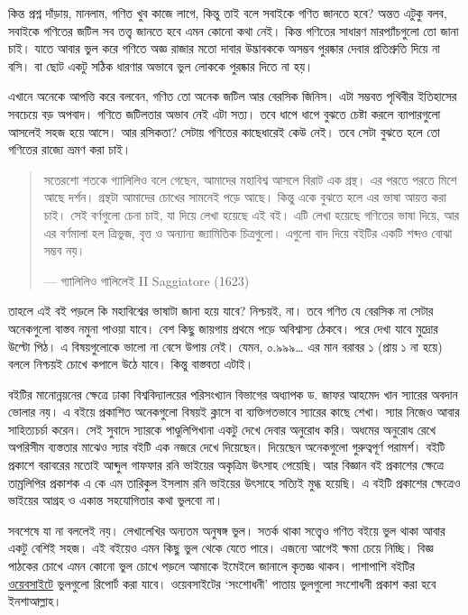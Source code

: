 \documentclass[
]{book}
\begin{document}
কিন্ত প্রশ্ন দাঁড়ায়, মানলাম, গণিত খুব কাজে লাগে, কিন্তু তাই বলে সবাইকে গণিত জানতে হবে? অন্তত এটুকু বলব, সবাইকে গণিতের জটিল সব তত্ত্ব জানতে হবে এমন কোনো কথা নেই। কিন্ত গণিতের সাধারণ মারপ্যাঁচগুলো তো জানা চাই। যাতে আবার ভুল করে গণিতে অজ্ঞ রাজার মতো দাবার উদ্ভাবককে অসম্ভব পুরষ্কার দেবার প্রতিশ্রুতি দিয়ে না বসি। বা ছোট একটু সঠিক ধারণার অভাবে ভুল লোককে পুরষ্কার দিতে না হয়।

এখানে অনেকে আপত্তি করে বলবেন, গণিত তো অনেক জটিল আর বেরসিক জিনিস। এটা সম্ভবত পৃথিবীর ইতিহাসের সবচেয়ে বড় অপবাদ। গণিতে জটিলতার অভাব নেই এটা সত্য। তবে ধাপে ধাপে বুঝতে চেষ্টা করলে ব্যাপারগুলো আসলেই সহজ হয়ে আসে। আর রসিকতা? সেটায় গণিতের কাছেধারেই কেউ নেই। তবে সেটা বুঝতে হলে তো গণিতের রাজ্যে ভ্রমণ করা চাই।

\begin{quote}
সতেরশো শতকে গ্যালিলিও বলে গেছেন, আমাদের মহাবিশ্ব আসলে বিরাট এক গ্রন্থ। এর পরতে পরতে মিশে আছে দর্শন। গ্রন্থটা আমাদের চোখের সামনেই পড়ে আছে। কিন্তু একে বুঝতে হলে এর ভাষা আয়ত্ত করা চাই। সেই বর্ণগুলো চেনা চাই, যা দিয়ে লেখা হয়েছে এই বই। এটি লেখা হয়েছে গণিতের ভাষা দিয়ে, আর এর বর্ণমালা হল ত্রিভুজ, বৃত্ত ও অন্যান্য জ্যামিতিক চিত্রগুলো। এগুলো বাদ দিয়ে বইটির একটি শব্দও বোঝা সম্ভব নয়।

--- গ্যালিলিও গালিলেই II Saggiatore (1623)
\end{quote}

তাহলে এই বই পড়লে কি মহাবিশ্বের ভাষাটা জানা হয়ে যাবে? নিশ্চয়ই, না। তবে গণিত যে বেরসিক না সেটার অনেকগুলো বাস্তব নমুনা পাওয়া যাবে। বেশ কিছু জায়গায় প্রথমে পড়ে অবিশ্বাস্য ঠেকবে। পরে দেখা যাবে মুদ্রোর উল্টো পিঠ। এ বিষয়গুলোকে ভালো না বেসে উপায় নেই। যেমন, ০.৯৯৯\ldots{} এর মান বরাবর ১ (প্রায় ১ না হয়ে) বললে নিশ্চয়ই চোখে কপালে উঠে যাবে। কিন্তু বাস্তবতা এটাই।

বইটির মানোন্নয়নের ক্ষেত্রে ঢাকা বিশ্ববিদ্যালয়ের পরিসংখ্যান বিভাগের অধ্যাপক ড. জাফর আহমেদ খান স্যারের অবদান ভোলার নয়। এ বইয়ে প্রকাশিত অনেকগুলো বিষয়ই ক্লাসে বা ব্যক্তিগতভাবে স্যারের কাছে শেখা। স্যার নিজেও আবার সাহিত্যচর্চা করেন। সেই সুবাদে স্যারকে পাণ্ডুলিপিখানা একটু দেখে দেবার অনুরোধ করি। অধমের অনুরোধ রেখে অপরিসীম ব্যস্ততার মাঝেও স্যার বইটি এক নজরে দেখে দিয়েছেন। দিয়েছেন অনেকগুলো গুরুত্বপূর্ণ পরামর্শ। বইটি প্রকাশে বরাবরের মতোই আব্দুল গাফফার রনি ভাইয়ের অকৃত্রিম উৎসাহ পেয়েছি। আর বিজ্ঞান বই প্রকাশের ক্ষেত্রে তাম্রলিপির প্রকাশক এ কে এম তারিকুল ইসলাম রনি ভাইয়ের উৎসাহে সত্যিই মুগ্ধ হয়েছি। এ বইটি প্রকাশের ক্ষেত্রেও ভাইয়ের আগ্রহ ও একান্ত সহযোগিতার কথা ভুলবো না।

সবশেষে যা না বললেই নয়। লেখালেখির অন্যতম অনুষঙ্গ ভুল। সতর্ক থাকা সত্ত্বেও গণিত বইয়ে ভুল থাকা আবার একটু বেশিই সহজ। এই বইয়েও এমন কিছু ভুল থেকে যেতে পারে। এজন্যে আগেই ক্ষমা চেয়ে নিচ্ছি। বিজ্ঞ পাঠকের চোখে এমন কোনো ভুল চোখে পড়লে আমাকে ইমেইলে জানালে কৃতজ্ঞ থাকব। পাশাপাশি বইটির \href{https://github.com/mahmudstat/os/issues/new}{ওয়েবসাইটে} ভুলগুলো রিপোর্ট করা যাবে। ওয়েবসাইটের `সংশোধনী' পাতায় ভুলগুলো সংশোধনী প্রকাশ করা হবে ইনশাআল্লাহ।
\end{document}
